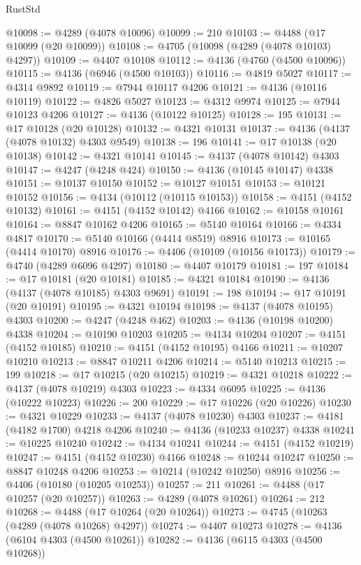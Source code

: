 \begin{lexlean}{RustStd}
\begin{coremodule}
@10098 := @4289 (@4078 @10096)
@10099 := 210
@10103 := @4488 (@17 @10099 (@20 @10099))
@10108 := @4705 (@10098 (@4289 (@4078 @10103) @4297))
@10109 := @4407 @10108
@10112 := @4136 (@4760 (@4500 @10096))
@10115 := @4136 (@6946 (@4500 @10103))
@10116 := @4819 @5027
@10117 := @4314 @9892
@10119 := @7944 @10117 @4206
@10121 := @4136 (@10116 @10119)
@10122 := @4826 @5027
@10123 := @4312 @9974
@10125 := @7944 @10123 @4206
@10127 := @4136 (@10122 @10125)
@10128 := 195
@10131 := @17 @10128 (@20 @10128)
@10132 := @4321 @10131
@10137 := @4136 (@4137 (@4078 @10132) @4303 @9549)
@10138 := 196
@10141 := @17 @10138 (@20 @10138)
@10142 := @4321 @10141
@10145 := @4137 (@4078 @10142) @4303
@10147 := @4247 (@4248 @424)
@10150 := @4136 (@10145 @10147) @4338
@10151 := @10137 @10150
@10152 := @10127 @10151
@10153 := @10121 @10152
@10156 := @4134 (@10112 (@10115 @10153))
@10158 := @4151 (@4152 @10132)
@10161 := @4151 (@4152 @10142) @4166
@10162 := @10158 @10161
@10164 := @8847 @10162 @4206
@10165 := @5140 @10164
@10166 := @4334 @4817
@10170 := @5140 @10166 (@4414 @8519) @8916
@10173 := @10165 (@4414 @10170) @8916
@10176 := @4406 (@10109 (@10156 @10173))
@10179 := @4740 (@4289 @6096 @4297)
@10180 := @4407 @10179
@10181 := 197
@10184 := @17 @10181 (@20 @10181)
@10185 := @4321 @10184
@10190 := @4136 (@4137 (@4078 @10185) @4303 @9691)
@10191 := 198
@10194 := @17 @10191 (@20 @10191)
@10195 := @4321 @10194
@10198 := @4137 (@4078 @10195) @4303
@10200 := @4247 (@4248 @462)
@10203 := @4136 (@10198 @10200) @4338
@10204 := @10190 @10203
@10205 := @4134 @10204
@10207 := @4151 (@4152 @10185)
@10210 := @4151 (@4152 @10195) @4166
@10211 := @10207 @10210
@10213 := @8847 @10211 @4206
@10214 := @5140 @10213
@10215 := 199
@10218 := @17 @10215 (@20 @10215)
@10219 := @4321 @10218
@10222 := @4137 (@4078 @10219) @4303
@10223 := @4334 @6095
@10225 := @4136 (@10222 @10223)
@10226 := 200
@10229 := @17 @10226 (@20 @10226)
@10230 := @4321 @10229
@10233 := @4137 (@4078 @10230) @4303
@10237 := @4181 (@4182 @1700) @4218 @4206
@10240 := @4136 (@10233 @10237) @4338
@10241 := @10225 @10240
@10242 := @4134 @10241
@10244 := @4151 (@4152 @10219)
@10247 := @4151 (@4152 @10230) @4166
@10248 := @10244 @10247
@10250 := @8847 @10248 @4206
@10253 := @10214 (@10242 @10250) @8916
@10256 := @4406 (@10180 (@10205 @10253))
@10257 := 211
@10261 := @4488 (@17 @10257 (@20 @10257))
@10263 := @4289 (@4078 @10261)
@10264 := 212
@10268 := @4488 (@17 @10264 (@20 @10264))
@10273 := @4745 (@10263 (@4289 (@4078 @10268) @4297))
@10274 := @4407 @10273
@10278 := @4136 (@6104 @4303 (@4500 @10261))
@10282 := @4136 (@6115 @4303 (@4500 @10268))

\end{coremodule}
\end{lexlean}
